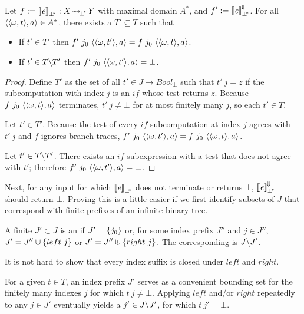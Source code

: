 \begin{theorem}
Let $f := \left\llbracket{\mathit{e}}\right\rrbracket_{\bot^{\mspace{-4mu}*}} : X \operatorname{\rightsquigarrow_{\mspace{-3mu}{\bot^{\mspace{-4mu}*}}}} Y$ with maximal domain $A^*$, and $f' := \left\llbracket{\mathit{e}}\right\rrbracket^{\mspace{-2mu}\Downarrow\mspace{-2mu}}_{\bot^{\mspace{-4mu}*}}$.
For all $\langle{\langle{\omega,t}\rangle,a}\rangle \in A^*$, there exists a $T' \subseteq T$ such that
\begin{itemize}
	\item If $t' \in T'$ then $f'~j_0~\langle{\langle{\omega,t'}\rangle,a}\rangle = f~j_0~\langle{\langle{\omega,t}\rangle,a}\rangle$.
	\item If $t' \in T \backslash T'$ then $f'~j_0~\langle{\langle{\omega,t'}\rangle,a}\rangle = \bot$.
\end{itemize}
\end{theorem}
\begin{proof}
Define $T'$ as the set of all $t' \in J \to Bool_\bot$ such that $t'~j = z$ if the subcomputation with index $j$ is an $if$ whose test returns $z$.
Because $f~j_0~\langle{\langle{\omega,t}\rangle,a}\rangle$ terminates, $t'~j \neq \bot$ for at most finitely many $j$, so each $t' \in T$.

Let $t' \in T'$.
Because the test of every $if$ subcomputation at index $j$ agrees with $t'~j$ and $f$ ignores branch traces, $f'~j_0~\langle{\langle{\omega,t'}\rangle,a}\rangle = f~j_0~\langle{\langle{\omega,t}\rangle,a}\rangle$.

Let $t' \in T \backslash T'$.
There exists an $if$ subexpression with a test that does not agree with $t'$; therefore $f'~j_0~\langle{\langle{\omega,t'}\rangle,a}\rangle = \bot$.
\end{proof}

Next, for any input for which $\left\llbracket{\mathit{e}}\right\rrbracket_{\bot^{\mspace{-4mu}*}}$ does not terminate or returns $\bot$, $\left\llbracket{\mathit{e}}\right\rrbracket^{\mspace{-2mu}\Downarrow\mspace{-2mu}}_{\bot^{\mspace{-4mu}*}}$ should return $\bot$.
Proving this is a little easier if we first identify subsets of $J$ that correspond with finite prefixes of an infinite binary tree.

\begin{definition}
\label{def:index-prefix}
A finite $J' \subset J$ is an  if $J' = \{{j_0}\}$ or, for some index prefix $J''$ and $j \in J''$, $J' = J'' \uplus \{{left~j}\}$ or $J' = J'' \uplus \{{right~j}\}$.
The corresponding  is $J \backslash J'$.
\end{definition}

It is not hard to show that every index suffix is closed under $left$ and $right$.

For a given $t \in T$, an index prefix $J'$ serves as a convenient bounding set for the finitely many indexes $j$ for which $t~j \neq \bot$.
Applying $left$ and/or $right$ repeatedly to any $j \in J'$ eventually yields a $j' \in J \backslash J'$, for which $t~j' = \bot$.

